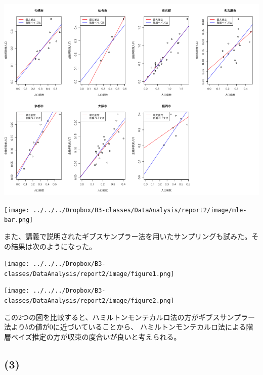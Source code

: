 \documentclass[a4j,xelatex,ja=standard,jafont=hiragino-pron, 9pt]{bxjsarticle}
\let\origfigure=\figure
\let\endorigfigure=\endfigure
\renewenvironment{figure}[1][]{%
  \origfigure[H]
}{%
  \endorigfigure
}
\begin{document}
\begin{figure}
\centering
\includegraphics[width=15cm]{../src/output/image/mle-mcmc.png}
\caption{階層ベイズ法(ハミルトンモンテカルロ法)と最尤推定法の比較}
\end{figure}

\begin{figure}
  \centering
  \texttt{[image: ../../../Dropbox/B3-classes/DataAnalysis/report2/image/mle-bar.png]}
  \caption{ハミルトンモンテカルロ法と最尤推定法の$a$ と $b$ の値の比較}
  \label{}
\end{figure}

また、講義で説明されたギブスサンプラー法を用いたサンプリングも試みた。その結果は次のようになった。

\begin{figure}
  \centering
  \texttt{[image: ../../../Dropbox/B3-classes/DataAnalysis/report2/image/figure1.png]}
  \caption{ギブスサンプラー法と最尤推定法の比較}
\end{figure}

\begin{figure}
  \centering
  \texttt{[image: ../../../Dropbox/B3-classes/DataAnalysis/report2/image/figure2.png]}
  \caption{ギブスサンプラー法と最尤推定法の $a$ と $b$ の比較}
  \label{}
\end{figure}

この2つの図を比較すると、ハミルトンモンテカルロ法の方がギブスサンプラー法より$b$の値が0に近づいていることから、
ハミルトンモンテカルロ法による階層ベイズ推定の方が収束の度合いが良いと考えられる。

\subsection*{(3)}
\end{document}
